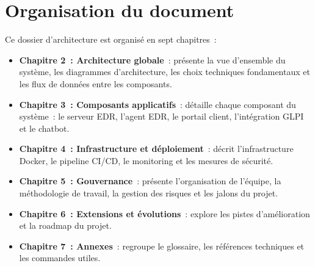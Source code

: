 \section{Organisation du document}

Ce dossier d'architecture est organisé en sept chapitres~:

\begin{itemize}
  \item \textbf{Chapitre 2~: Architecture globale}~: présente la vue
    d'ensemble du système, les diagrammes d'architecture, les choix
    techniques fondamentaux et les flux de données entre les composants.
  \item \textbf{Chapitre 3~: Composants applicatifs}~: détaille chaque
    composant du système~: le serveur EDR, l'agent EDR, le portail
    client, l'intégration GLPI et le chatbot.
  \item \textbf{Chapitre 4~: Infrastructure et déploiement}~: décrit
    l'infrastructure Docker, le pipeline CI/CD, le monitoring et les
    mesures de sécurité.
  \item \textbf{Chapitre 5~: Gouvernance}~: présente l'organisation de
    l'équipe, la méthodologie de travail, la gestion des risques et les
    jalons du projet.
  \item \textbf{Chapitre 6~: Extensions et évolutions}~: explore les
    pistes d'amélioration et la roadmap du projet.
  \item \textbf{Chapitre 7~: Annexes}~: regroupe le glossaire, les
    références techniques et les commandes utiles.
\end{itemize}
